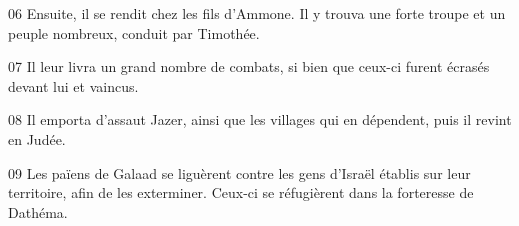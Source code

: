 
06 Ensuite, il se rendit chez les fils d’Ammone. Il y trouva une forte troupe et un peuple nombreux, conduit par Timothée.

07 Il leur livra un grand nombre de combats, si bien que ceux-ci furent écrasés devant lui et vaincus.

08 Il emporta d’assaut Jazer, ainsi que les villages qui en dépendent, puis il revint en Judée.

09 Les païens de Galaad se liguèrent contre les gens d’Israël établis sur leur territoire, afin de les exterminer. Ceux-ci se réfugièrent dans la forteresse de Dathéma.
